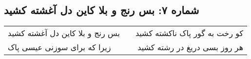 \begin{center}
\section*{شماره ۷: بس رنج و بلا کاین دل آغشته کشید}
\label{sec:007}
\begin{longtable}{l p{0.5cm} r}
بس رنج و بلا کاین دل آغشته کشید
&&
کو رخت به گور پاک ناکشته کشید
\\
زیرا که برای سوزنی عیسی پاک
&&
هر روز بسی دریغ در رشته کشید
\\
\end{longtable}
\end{center}
